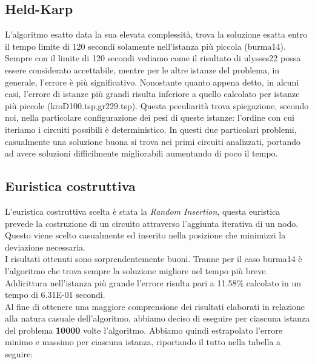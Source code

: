 \documentclass{article}
\begin{document}
\subsection*{Held-Karp}
L'algoritmo esatto data la sua elevata complessità, trova la soluzione esatta entro il tempo limite di 120 secondi solamente nell'istanza più piccola (burma14). Sempre con il limite di 120 secondi vediamo come il risultato di ulysses22 possa essere considerato accettabile, mentre per le altre istanze del problema, in generale, l'errore è più significativo. Nonostante quanto appena detto, in alcuni casi, l'errore di istanze più grandi risulta inferiore a quello calcolato per istanze più piccole (kroD100.tsp,gr229.tsp). Questa peculiarità trova spiegazione, secondo noi, nella particolare configurazione dei pesi di queste istanze: l'ordine con cui iteriamo i circuiti possibili è deterministico. In questi due particolari problemi, casualmente una soluzione buona si trova nei primi circuiti analizzati, portando ad avere soluzioni difficilmente migliorabili aumentando di poco il tempo.

\subsection*{Euristica costruttiva}
L'euristica costruttiva scelta è stata la \textit{Random Insertion}, questa euristica prevede la costruzione di un circuito attraverso l'aggiunta iterativa di un nodo. 
Questo viene scelto casualmente ed inserito nella posizione che minimizzi la deviazione necessaria.\\
I risultati ottenuti sono sorprendentemente buoni. Tranne per il caso burma14 è l'algoritmo che trova sempre la soluzione migliore nel tempo più breve. Addirittura nell'istanza più grande l'errore risulta pari a 11.58\% calcolato in un tempo di 6.31E-01 secondi.\\
Al fine di ottenere una maggiore comprensione dei risultati elaborati in relazione alla natura casuale dell'algoritmo, abbiamo deciso di eseguire per ciascuna istanza del problema \textbf{10000} volte l'algoritmo. Abbiamo quindi estrapolato l'errore minimo e massimo per ciascuna istanza, riportando il tutto nella tabella a seguire:\\ 
\end{document}
